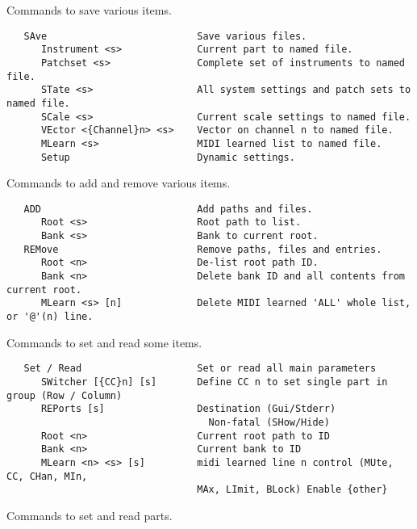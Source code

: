    Commands to save various items.

\begin{verbatim}
   SAve                          Save various files.
      Instrument <s>             Current part to named file.
      Patchset <s>               Complete set of instruments to named file.
      STate <s>                  All system settings and patch sets to named file.
      SCale <s>                  Current scale settings to named file.
      VEctor <{Channel}n> <s>    Vector on channel n to named file.
      MLearn <s>                 MIDI learned list to named file.
      Setup                      Dynamic settings.
\end{verbatim}

   Commands to add and remove various items.

\begin{verbatim}
   ADD                           Add paths and files.
      Root <s>                   Root path to list.
      Bank <s>                   Bank to current root.
   REMove                        Remove paths, files and entries.
      Root <n>                   De-list root path ID.
      Bank <n>                   Delete bank ID and all contents from current root.
      MLearn <s> [n]             Delete MIDI learned 'ALL' whole list, or '@'(n) line.
\end{verbatim}

   Commands to set and read some items.

\begin{verbatim}
   Set / Read                    Set or read all main parameters
      SWitcher [{CC}n] [s]       Define CC n to set single part in group (Row / Column)
      REPorts [s]                Destination (Gui/Stderr)
                                   Non-fatal (SHow/Hide)
      Root <n>                   Current root path to ID
      Bank <n>                   Current bank to ID
      MLearn <n> <s> [s]         midi learned line n control (MUte, CC, CHan, MIn,
                                 MAx, LImit, BLock) Enable {other}
\end{verbatim}

   Commands to set and read parts.

